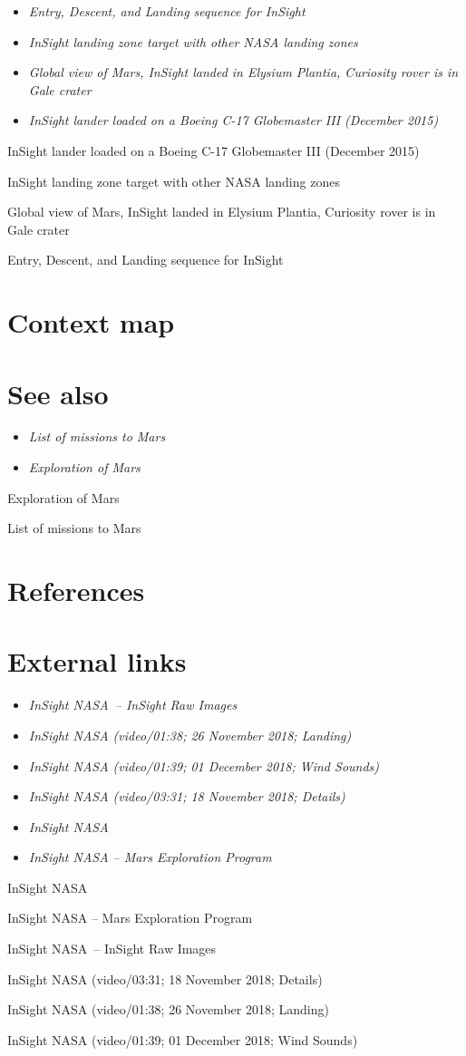 \begin{itemize}
\item
  \emph{Entry, Descent, and Landing sequence for InSight}
\item
  \emph{InSight landing zone target with other NASA landing zones}
\item
  \emph{Global view of Mars, InSight landed in Elysium Plantia,
  Curiosity rover is in Gale crater}
\item
  \emph{InSight lander loaded on a Boeing C-17 Globemaster III (December
  2015)}
\end{itemize}

InSight lander loaded on a Boeing C-17 Globemaster III (December 2015)

InSight landing zone target with other NASA landing zones

Global view of Mars, InSight landed in Elysium Plantia, Curiosity rover
is in Gale crater

Entry, Descent, and Landing sequence for InSight

\section{Context map}\label{context-map}

\section{See also}\label{see-also}

\begin{itemize}
\item
  \emph{List of missions to Mars}
\item
  \emph{Exploration of Mars}
\end{itemize}

Exploration of Mars

List of missions to Mars

\section{References}\label{references}

\section{External links}\label{external-links}

\begin{itemize}
\item
  \emph{InSight NASA~-- InSight Raw Images}
\item
  \emph{InSight NASA (video/01:38; 26 November 2018; Landing)}
\item
  \emph{InSight NASA (video/01:39; 01 December 2018; Wind Sounds)}
\item
  \emph{InSight NASA (video/03:31; 18 November 2018; Details)}
\item
  \emph{InSight NASA}
\item
  \emph{InSight NASA -- Mars Exploration Program}
\end{itemize}

InSight NASA

InSight NASA -- Mars Exploration Program

InSight NASA~-- InSight Raw Images

InSight NASA (video/03:31; 18 November 2018; Details)

InSight NASA (video/01:38; 26 November 2018; Landing)

InSight NASA (video/01:39; 01 December 2018; Wind Sounds)

